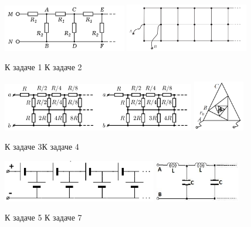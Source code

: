 \documentclass[14pt]{article}
\begin{document}
\begin{figure}[f]
\begin{center}
\includegraphics[width=0.48\textwidth]{infcirc1.png}
\includegraphics[width=0.48\textwidth]{infcirc2.png}
\caption{К задаче 1\hspace{7cm} К задаче 2}
\end{center}
\end{figure}
\begin{figure}[f]
\begin{center}
\includegraphics[width=0.75\textwidth]{infcirc3.png}
\hspace{0.3cm}
\includegraphics[width=0.2\textwidth]{infcirc9.png}
\caption{\hspace{4.7cm}К задаче 3\hspace{6.8cm}К задаче 4}
\end{center}
\end{figure}
\begin{figure}[f]
\begin{center}
\includegraphics[width=0.6\textwidth]{infcirc4.png}
\hspace{0.5cm}
\includegraphics[width=0.33\textwidth]{infcirc5.jpg}
\caption{\hspace{2cm}К задаче 5\hspace{7cm} К задаче 7}
\end{center}
\end{figure}
\end{document}
